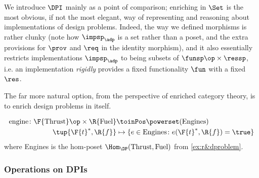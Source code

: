 We introduce $\DPI$ mainly as a point of comparison; enriching in $\Set$ is the most obvious, if not the most elegant, way of representing and reasoning about implementations of design problems. Indeed, the way we defined morphisms is rather clunky (note how $\impsp_\adp$ is a set rather than a poset, and the extra provisions for $\prov$ and $\req$ in the identity morphism), and it also essentially restricts implementations $\impsp_\adp$ to being subsets of $\funsp\op \times \ressp$, i.e. an implementation \emph{rigidly} provides a fixed functionality $\fun$ with a fixed $\res$.

The far more natural option, from the perspective of enriched category theory, is to enrich design problems in \DP itself.

\begin{example}
\begin{equation}
\begin{aligned}
\text{engine} \colon \F{\text{Thrust}}\op \times \R{\text{Fuel}} &\toinPos \powerset(\text{Engines}) \\
\tup{\F{t}^*,\R{f}} &\mapsto \{ e \in \text{Engines} \colon e(\F{t}^*, \R{f}) = \true \}
\end{aligned}
\end{equation}
where Engines is the hom-poset $\Hom_\DP(\text{Thrust}, \text{Fuel})$ from \cref{ex:r&dproblem}.
\end{example}

\subsubsection{Operations on DPIs}




